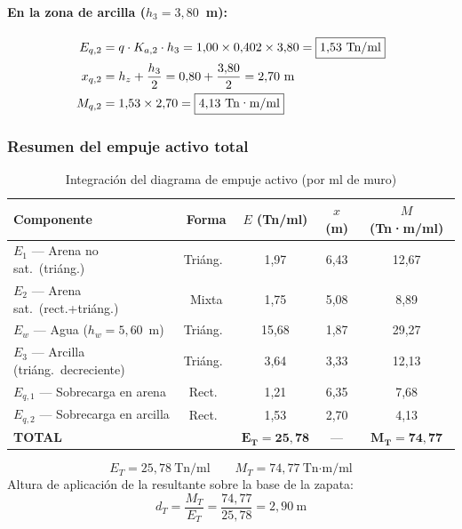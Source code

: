 \paragraph{En la zona de arcilla ($h_3 = 3{,}80$~m):}
\begin{align*}
  E_{q,2} &= q \cdot K_{a,2} \cdot h_3
            = 1{,}00 \times 0{,}402 \times 3{,}80 = \boxed{1{,}53~\text{Tn/ml}} \\
  x_{q,2} &= h_z + \frac{h_3}{2} = 0{,}80 + \frac{3{,}80}{2} = 2{,}70~\text{m} \\
  M_{q,2} &= 1{,}53 \times 2{,}70 = \boxed{4{,}13~\text{Tn·m/ml}}
\end{align*}

\subsubsection{Resumen del empuje activo total}

\begin{table}[H]
  \centering
  \caption{Integración del diagrama de empuje activo (por ml de muro)}
  \label{tab:empuje_activo_opc}
  \begin{tabular}{@{}lcccc@{}}
    \toprule
    \textbf{Componente} & \textbf{Forma}
    & $E$ \textbf{(Tn/ml)} & $x$ \textbf{(m)} & $M$ \textbf{(Tn·m/ml)} \\
    \midrule
    $E_1$ — Arena no sat.\ (triáng.) & Triáng.\ & 1{,}97 & 6{,}43 & 12{,}67 \\
    $E_2$ — Arena sat.\ (rect.+triáng.) & Mixta  & 1{,}75 & 5{,}08 &  8{,}89 \\
    $E_w$ — Agua ($h_w=5{,}60$~m) & Triáng.\  & 15{,}68 & 1{,}87 & 29{,}27 \\
    $E_3$ — Arcilla (triáng.\ decreciente) & Triáng.\ & 3{,}64 & 3{,}33 & 12{,}13 \\
    $E_{q,1}$ — Sobrecarga en arena & Rect.\ & 1{,}21 & 6{,}35 & 7{,}68 \\
    $E_{q,2}$ — Sobrecarga en arcilla & Rect.\  & 1{,}53 & 2{,}70 & 4{,}13 \\
    \midrule
    \textbf{TOTAL} & & $\mathbf{E_T = 25{,}78}$ & — & $\mathbf{M_T = 74{,}77}$ \\
    \bottomrule
  \end{tabular}
\end{table}

\begin{resultadobox}
  \[
    E_T = 25{,}78~\text{Tn/ml}
    \qquad
    M_T = 74{,}77~\text{Tn·m/ml}
  \]
  Altura de aplicación de la resultante sobre la base de la zapata:
  \[
    d_T = \frac{M_T}{E_T} = \frac{74{,}77}{25{,}78} = 2{,}90~\text{m}
  \]
\end{resultadobox}

